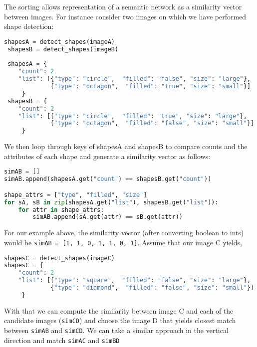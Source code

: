 \documentclass[10pt,letterpaper]{article}
\begin{document}
The sorting allows representation of a semantic network as a similarity vector between images. For instance consider two images on which we have performed shape detection:
\begin{small}
\begin{lstlisting}[language=python]
 shapesA = detect_shapes(imageA)
 shapesB = detect_shapes(imageB)
 
 shapesA = {
	"count": 2
	"list": [{"type": "circle",  "filled": "false", "size": "large"},
	         {"type": "octagon",  "filled": "true", "size": "small"}]
	 } 
 shapesB = {
	"count": 2
	"list": [{"type": "circle",  "filled": "true", "size": "large"},
	         {"type": "octagon",  "filled": "false", "size": "small"}]
	 } 
\end{lstlisting}
\end{small}
We then loop through keys of shapesA and shapesB to compare counts and the attributes of each shape and generate a similarity vector as follows:
\begin{small}
\begin{lstlisting}[language=python]
simAB = []
simAB.append(shapesA.get("count") == shapesB.get("count"))

shape_attrs = ["type", "filled", "size"]
for sA, sB in zip(shapesA.get("list"), shapesB.get("list")):
	for attr in shape_attrs:
		simAB.append(sA.get(attr) == sB.get(attr))
\end{lstlisting}
\end{small}
For our example above, the similarity vector (after converting boolean to ints) would be {\tt simAB = [1, 1, 0, 1, 1, 0, 1]}. Assume that our image C yields, 
\begin{small}
\begin{lstlisting}[language=python]
shapesC = detect_shapes(imageC)
shapesC = {
	"count": 2
	"list": [{"type": "square",  "filled": "false", "size": "large"},
	         {"type": "diamond",  "filled": "false", "size": "small"}]
	 } 
\end{lstlisting}
\end{small}
With that we can compute the similarity between image C and each of the candidate images ({\tt simCD}) and choose the image D that yields closest match between {\tt simAB} and {\tt simCD}. We can take a similar approach in the vertical direction and match {\tt simAC} and {\tt simBD}
\end{document}
